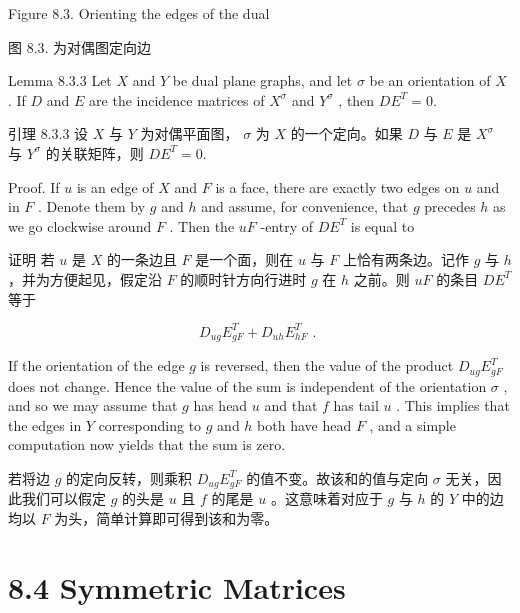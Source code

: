 \documentclass[10pt]{article}
\begin{document}
Figure 8.3. Orienting the edges of the dual

\begin{tcolorbox}\relax
图 8.3. 为对偶图定向边
\end{tcolorbox}

Lemma 8.3.3 Let \(X\) and \(Y\) be dual plane graphs, and let \(\sigma\) be an orientation of \(X\) . If \(D\) and \(E\) are the incidence matrices of \({X}^{\sigma }\) and \({Y}^{\sigma }\) , then \(D{E}^{T} = 0.\)

\begin{tcolorbox}\relax
引理 8.3.3 设 \(X\) 与 \(Y\) 为对偶平面图， \(\sigma\) 为 \(X\) 的一个定向。如果 \(D\) 与 \(E\) 是 \({X}^{\sigma }\) 与 \({Y}^{\sigma }\) 的关联矩阵，则 \(D{E}^{T} = 0.\)
\end{tcolorbox}

Proof. If \(u\) is an edge of \(X\) and \(F\) is a face, there are exactly two edges on \(u\) and in \(F\) . Denote them by \(g\) and \(h\) and assume, for convenience, that \(g\) precedes \(h\) as we go clockwise around \(F\) . Then the \({uF}\) -entry of \(D{E}^{T}\) is equal to

\begin{tcolorbox}\relax
证明 若 \(u\) 是 \(X\) 的一条边且 \(F\) 是一个面，则在 \(u\) 与 \(F\) 上恰有两条边。记作 \(g\) 与 \(h\) ，并为方便起见，假定沿 \(F\) 的顺时针方向行进时 \(g\) 在 \(h\) 之前。则 \({uF}\) 的条目 \(D{E}^{T}\) 等于
\end{tcolorbox}

\[
{D}_{ug}{E}_{gF}^{T} + {D}_{uh}{E}_{hF}^{T}\text{ . }
\]

If the orientation of the edge \(g\) is reversed, then the value of the product \({D}_{ug}{E}_{gF}^{T}\) does not change. Hence the value of the sum is independent of the orientation \(\sigma\) , and so we may assume that \(g\) has head \(u\) and that \(f\) has tail \(u\) . This implies that the edges in \(Y\) corresponding to \(g\) and \(h\) both have head \(F\) , and a simple computation now yields that the sum is zero.

\begin{tcolorbox}\relax
若将边 \(g\) 的定向反转，则乘积 \({D}_{ug}{E}_{gF}^{T}\) 的值不变。故该和的值与定向 \(\sigma\) 无关，因此我们可以假定 \(g\) 的头是 \(u\) 且 \(f\) 的尾是 \(u\) 。这意味着对应于 \(g\) 与 \(h\) 的 \(Y\) 中的边均以 \(F\) 为头，简单计算即可得到该和为零。
\end{tcolorbox}

\section*{8.4 Symmetric Matrices}
\end{document}
